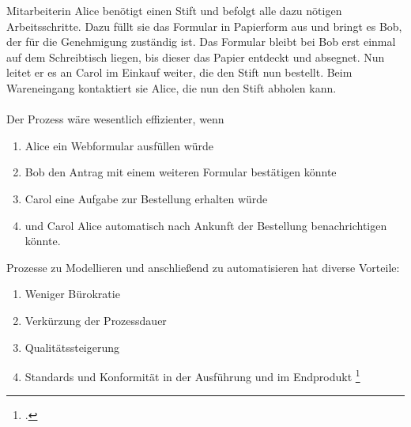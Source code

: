 \begin{figure}[H]
\begin{minipage}{\linewidth}
\begin{center}
\end{center}
\end{minipage}
\end{figure}


Mitarbeiterin Alice benötigt einen Stift und befolgt alle dazu nötigen
Arbeitsschritte. Dazu füllt sie das Formular in Papierform aus und bringt es
Bob, der für die Genehmigung zuständig ist. Das Formular bleibt bei Bob erst
einmal auf dem Schreibtisch liegen, bis dieser das Papier entdeckt und absegnet.
Nun leitet er es an Carol im Einkauf weiter, die den Stift nun bestellt. Beim
Wareneingang kontaktiert sie Alice, die nun den Stift abholen kann.
\\
\\
Der Prozess wäre wesentlich effizienter, wenn
\begin{enumerate}
  \item Alice ein Webformular ausfüllen würde
  \item Bob den Antrag mit einem weiteren Formular
bestätigen könnte
\item Carol eine Aufgabe zur Bestellung erhalten würde
\item und Carol Alice automatisch nach Ankunft der Bestellung benachrichtigen
könnte.
\end{enumerate}

Prozesse zu Modellieren und anschließend zu automatisieren hat diverse Vorteile:

\begin{enumerate}
\item Weniger Bürokratie
\item Verkürzung der Prozessdauer
\item Qualitätssteigerung
\item Standards und Konformität in der Ausführung und im Endprodukt
\footcite{automatisierungspros}
\end{enumerate}

